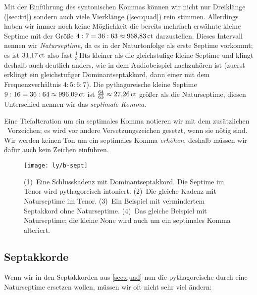 Mit der Einführung des syntonischen Kommas können wir nicht nur Dreiklänge
(\cref{sec:tri}) sondern auch viele Vierklänge (\cref{sec:quad}) rein stimmen.
Allerdings haben wir immer noch keine Möglichkeit die bereits mehrfach erwähnte
kleine Septime mit der Größe $4:7=36:63\approx 968{,}83\,\mathrm{ct}$ darzustellen.
Dieses Intervall nennen wir \emph{Naturseptime}, da es in der Naturtonfolge als
erste Septime vorkommt; es ist $31{,}17\,\mathrm{ct}$ also fast
$\frac13\,\text{Hts}$ kleiner als die gleichstufige kleine Septime und
klingt deshalb auch deutlich anders, wie in dem Audiobeispiel nachzuhören
ist (zuerst erklingt ein gleichstufiger Dominantseptakkord, dann
einer mit dem Frequenzverhältnis $4:5:6:7$). Die pythagoreische kleine Septime
$9:16=36:64\approx 996{,}09\,\mathrm{ct}$ ist
$\frac{64}{63}\approx 27{,}26\,\mathrm{ct}$ größer als die Naturseptime, diesen
Unterschied nennen wir das \emph{septimale Komma}.

Eine Tiefalteration um ein septimales Komma notieren wir mit dem zusätzlichen
\septimal\ Vorzeichen; es wird vor andere Versetzungszeichen gesetzt, wenn sie
nötig sind. Wir werden keinen Ton um ein septimales Komma \emph{erhöhen},
deshalb müssen wir dafür auch kein Zeichen einführen.

\begin{figure}
	\centering
	\texttt{[image: ly/b-sept]}
	\caption{(1)~Eine Schlusskadenz mit Dominantseptakkord. Die Septime im
		Tenor wird pythagoreisch intoniert.
		\quad(2)~Die gleiche Kadenz mit Naturseptime im Tenor.
		\quad(3)~Ein Beispiel mit vermindertem Septakkord ohne Naturseptime.
		\quad(4)~Das gleiche Beispiel mit Naturseptime; die kleine None wird
		auch um ein septimales Komma alteriert.}\label{fig:sept}
\end{figure}

\subsection{Septakkorde}

Wenn wir in den Septakkorden aus \cref{sec:quad} nun die pythagoreische durch
eine Naturseptime ersetzen wollen, müssen wir oft nicht sehr viel ändern:


